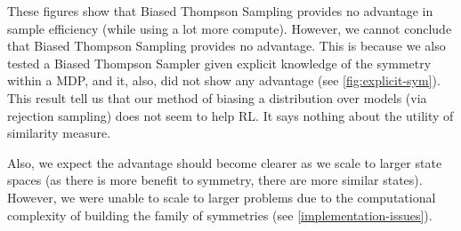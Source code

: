 

These figures show that Biased Thompson Sampling provides no advantage in sample efficiency (while using a lot more compute).
However, we cannot conclude that Biased Thompson Sampling provides no advantage. This is because we also tested a Biased Thompson Sampler given explicit knowledge of the symmetry within a MDP,
and it, also, did not show any advantage (see \ref{fig:explicit-sym}). This result tell us that our method of biasing a distribution over models (via rejection sampling)
does not seem to help RL. It says nothing about the utility of similarity measure.

Also, we expect the advantage should become clearer as we scale to larger state spaces (as there is more benefit to symmetry, there are more similar states).
However, we were unable to scale to larger problems due to the computational complexity of building the family of symmetries (see \ref{implementation-issues}).
